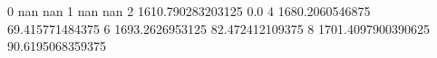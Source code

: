 0 nan nan
1 nan nan
2 1610.790283203125 0.0
4 1680.2060546875 69.415771484375
6 1693.2626953125 82.472412109375
8 1701.4097900390625 90.6195068359375
